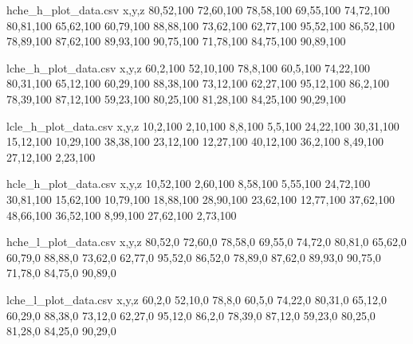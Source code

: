 \begingroup\newif\ifmy
{}
\ifmy
\begin{filecontents*}{hche_h_plot_data.csv}
x,y,z
80,52,100
72,60,100
78,58,100
69,55,100
74,72,100
80,81,100
65,62,100
60,79,100
88,88,100
73,62,100
62,77,100
95,52,100
86,52,100
78,89,100
87,62,100
89,93,100
90,75,100
71,78,100
84,75,100
90,89,100
\end{filecontents*}
\fi\endgroup

\begingroup\newif\ifmy
{}
\ifmy
\begin{filecontents*}{lche_h_plot_data.csv}
x,y,z
60,2,100
52,10,100
78,8,100
60,5,100
74,22,100
80,31,100
65,12,100
60,29,100
88,38,100
73,12,100
62,27,100
95,12,100
86,2,100
78,39,100
87,12,100
59,23,100
80,25,100
81,28,100
84,25,100
90,29,100
\end{filecontents*}
\fi\endgroup

\begingroup\newif\ifmy
{}
\ifmy
\begin{filecontents*}{lcle_h_plot_data.csv}
x,y,z
10,2,100
2,10,100
8,8,100
5,5,100
24,22,100
30,31,100
15,12,100
10,29,100
38,38,100
23,12,100
12,27,100
40,12,100
36,2,100
8,49,100
27,12,100
2,23,100
\end{filecontents*}
\fi\endgroup

\begingroup\newif\ifmy
{}
\ifmy
\begin{filecontents*}{hcle_h_plot_data.csv}
x,y,z
10,52,100
2,60,100
8,58,100
5,55,100
24,72,100
30,81,100
15,62,100
10,79,100
18,88,100
28,90,100
23,62,100
12,77,100
37,62,100
48,66,100
36,52,100
8,99,100
27,62,100
2,73,100
\end{filecontents*}
\fi\endgroup

\begingroup\newif\ifmy
{}
\ifmy
\begin{filecontents*}{hche_l_plot_data.csv}
x,y,z
80,52,0
72,60,0
78,58,0
69,55,0
74,72,0
80,81,0
65,62,0
60,79,0
88,88,0
73,62,0
62,77,0
95,52,0
86,52,0
78,89,0
87,62,0
89,93,0
90,75,0
71,78,0
84,75,0
90,89,0
\end{filecontents*}
\fi\endgroup

\begingroup\newif\ifmy
{}
\ifmy
\begin{filecontents*}{lche_l_plot_data.csv}
x,y,z
60,2,0
52,10,0
78,8,0
60,5,0
74,22,0
80,31,0
65,12,0
60,29,0
88,38,0
73,12,0
62,27,0
95,12,0
86,2,0
78,39,0
87,12,0
59,23,0
80,25,0
81,28,0
84,25,0
90,29,0
\end{filecontents*}
\fi\endgroup

